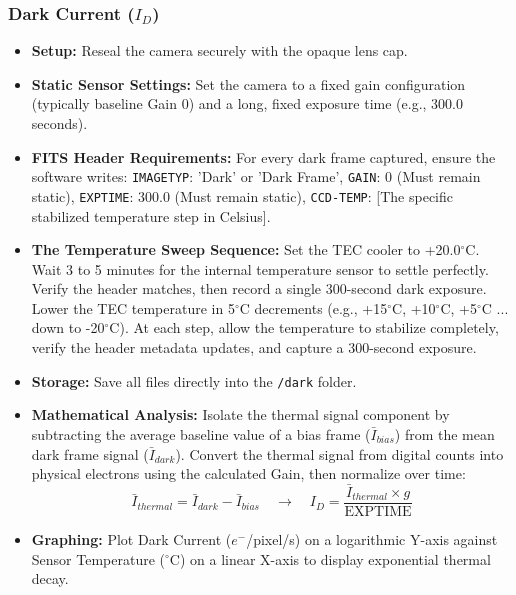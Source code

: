 \documentclass[11pt,a4paper]{article}
\begin{document}
\subsubsection{Dark Current ($I_D$)}
\begin{itemize}[leftmargin=*]
    \item \textbf{Setup:} Reseal the camera securely with the opaque lens cap.
    \item \textbf{Static Sensor Settings:} Set the camera to a fixed gain configuration (typically baseline Gain 0) and a long, fixed exposure time (e.g., 300.0 seconds).
    \item \textbf{FITS Header Requirements:} For every dark frame captured, ensure the software writes: \texttt{IMAGETYP}: 'Dark' or 'Dark Frame', \texttt{GAIN}: 0 (Must remain static), \texttt{EXPTIME}: 300.0 (Must remain static), \texttt{CCD-TEMP}: [The specific stabilized temperature step in Celsius].
    \item \textbf{The Temperature Sweep Sequence:} Set the TEC cooler to +20.0$^\circ$C. Wait 3 to 5 minutes for the internal temperature sensor to settle perfectly. Verify the header matches, then record a single 300-second dark exposure. Lower the TEC temperature in 5$^\circ$C decrements (e.g., +15$^\circ$C, +10$^\circ$C, +5$^\circ$C ... down to -20$^\circ$C). At each step, allow the temperature to stabilize completely, verify the header metadata updates, and capture a 300-second exposure.
    \item \textbf{Storage:} Save all files directly into the \texttt{/dark} folder.
    \item \textbf{Mathematical Analysis:} Isolate the thermal signal component by subtracting the average baseline value of a bias frame ($\bar{I}_{bias}$) from the mean dark frame signal ($\bar{I}_{dark}$). Convert the thermal signal from digital counts into physical electrons using the calculated Gain, then normalize over time:
    $$ \bar{I}_{thermal} = \bar{I}_{dark} - \bar{I}_{bias} \quad \rightarrow \quad I_D = \frac{\bar{I}_{thermal} \times g}{\text{EXPTIME}} $$
    \item \textbf{Graphing:} Plot Dark Current ($e^-$/pixel/s) on a logarithmic Y-axis against Sensor Temperature ($^\circ$C) on a linear X-axis to display exponential thermal decay.
\end{itemize}
\end{document}
